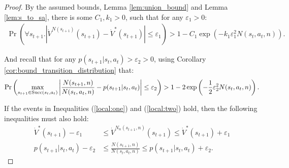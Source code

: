     \begin{proof}
        By the assumed bounds, Lemma \ref{lem:union_bound} and Lemma \ref{lem:s_to_sa}, there is some $C_1,k_1>0$, such that for any $\varepsilon_1 >0$:
        \begin{align}
            \Pr\left(\forall s_{t+1}. \left|\dot{V}^{N(s_{t+1})}(s_{t+1})-\dot{V}^*(s_{t+1}) \right| \leq \varepsilon_1 \right) > 1-C_1\exp(-k_1\varepsilon_1^2 N(s_t,a_t,n)). \label{local:one}
        \end{align}

        And recall that for any $p(s_{t+1}|s_t,a_t) > \varepsilon_2>0$, using Corollary \ref{cor:bound_transition_distribution} that:
        \begin{align}
            \Pr\left(\max_{s_{t+1}\in{\textnormal{Succ}(s_t,a_t)}} 
                \left| \frac{N(s_{t+1},n)}{N(s_t,a_t,n)} - p(s_{t+1}|s_t,a_t) \right| 
                \leq \varepsilon_2 \right) 
                    > 1 - 2 \exp\left(-\frac{1}{2}\varepsilon_2^2 N(s_t,a_t,n) \right). \label{local:two}
        \end{align}
        
        If the events in Inequalities (\ref{local:one}) and (\ref{local:two}) hold, then the following inequalities must also hold:
        \begin{align}
            \dot{V}^*(s_{t+1})- \varepsilon_1 
                &\leq \dot{V}^{N_n(s_{t+1},n)}(s_{t+1}) 
                \leq \dot{V}^*(s_{t+1})+ \varepsilon_1 \\
            p(s_{t+1}|s_t,a_t) - \varepsilon_2 
                &\leq \frac{N(s_{t+1},n)}{N(s_t,a_t,n)} 
                \leq p(s_{t+1}|s_t,a_t) + \varepsilon_2.
        \end{align} 
        

\end{proof}
